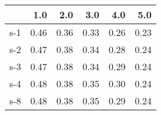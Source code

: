 \begin{tabular}{lrrrrr}
\toprule
{} &  1.0 &  2.0 &  3.0 &  4.0 &  5.0 \\
\midrule
s-1 & 0.46 & 0.36 & 0.33 & 0.26 & 0.23 \\
s-2 & 0.47 & 0.38 & 0.34 & 0.28 & 0.24 \\
s-3 & 0.47 & 0.38 & 0.34 & 0.29 & 0.24 \\
s-4 & 0.48 & 0.38 & 0.35 & 0.30 & 0.24 \\
s-8 & 0.48 & 0.38 & 0.35 & 0.29 & 0.24 \\
\bottomrule
\end{tabular}

